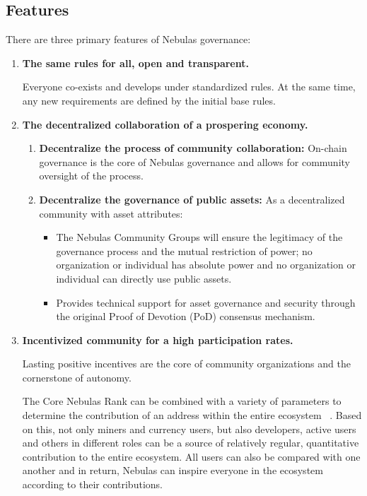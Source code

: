 \subsection{Features}

There are three primary features of Nebulas governance:

\begin{enumerate}
	\item

	\textbf{The same rules for all, open and transparent.}

	Everyone co-exists and develops under standardized rules. At the same time, any new requirements are defined by the initial base rules.

	\item

\textbf{The decentralized collaboration of a prospering economy.}


	\begin{enumerate}
		\item

		\textbf{Decentralize the process of community collaboration:} On-chain governance is the core of Nebulas governance and allows for community oversight of the process.

		\item

		\textbf{Decentralize the governance of public assets:} As a decentralized community with asset attributes:

		\begin{itemize}
			\item The Nebulas Community Groups will ensure the legitimacy of the governance process and the mutual restriction of power; no organization or individual has absolute power and no organization or individual can directly use public assets.
			\item Provides technical support for asset governance and security through the original Proof of Devotion (PoD) consensus mechanism.
		\end{itemize}

	\end{enumerate}

	\item

	\textbf{Incentivized community for a high participation rates.}

	Lasting positive incentives are the core of community organizations and the cornerstone of autonomy.

	The Core Nebulas Rank can be combined with a variety of parameters to determine the contribution of an address within the entire ecosystem ~\cite{yellowpaper}. Based on this, not only miners and currency users, but also developers, active users and others in different roles can be a source of relatively regular, quantitative contribution to the entire ecosystem. All users can also be compared with one another and in return, Nebulas can inspire everyone in the ecosystem according to their contributions.


\end{enumerate}
